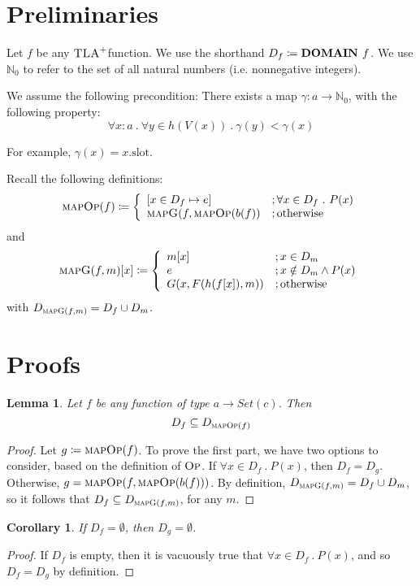 \documentclass{article}
\newtheorem{lemma}[theorem]{Lemma}
\newtheorem{corollary}[theorem]{Corollary}
\newcommand{\iteDef}[4]{
  #1 \coloneqq \left\{
\begin{array}{ll}
      #2 &; #3 \\
      #4 &; \text{otherwise}\\
\end{array} 
\right. 
}
\newcommand{\tlap}{$\textsc{TLA}^{+}$}
\newcommand{\nat}{\mathbb N_0}
\newcommand{\op}{\textsc{Op}}
\newcommand{\mop}{\textsc{mapOp}}
\newcommand{\mapg}{\textsc{mapG}}
\begin{document}
\section{Preliminaries}
Let $f$ be any \tlap function. We use the shorthand $D_f \coloneqq \text{\bf DOMAIN } f$.
We use $\nat$ to refer to the set of all natural numbers (i.e. nonnegative integers).

We assume the following precondition: There exists a map $\gamma: a \to \nat$, with the following property:
\[
\forall x\colon a \ .\ \forall y \in h(V(x)) \ .\ \gamma(y) < \gamma(x) 
\]

For example, $\gamma(x) = x.\text{slot}$.

Recall the following definitions:
\[
\iteDef{\mop(f)}{[ x \in D_f \mapsto e ]}{\forall x \in D_f \ .\ P(x)}{\mapg(f, \mop(b(f))}
\]
and
\[
\mapg(f, m)[x] \coloneqq \left\{
\begin{array}{ll}
      m[x] &; x \in D_m \\
      e &; x \notin D_m \land P(x) \\
      G(x, F(h(f[x]), m)) &; \text{otherwise}\\
\end{array} 
\right. 
\]
with $D_{\mapg(f,m)} = D_f \cup D_m$.

\section{Proofs}

\begin{lemma}\label{lemma1}
Let $f$ be any function of type $a \to Set(c)$. Then
\[
D_f \subseteq D_{\mop(f)}
\]
\end{lemma}
\begin{proof}
Let $g \coloneqq \mop(f)$. To prove the first part, we have two options to consider, based on the definition of $\op$. If $\forall x \in D_f \ .\ P(x)$, then $D_f = D_g$.
Otherwise, $g = \mop(f,\mop(b(f)))$. By definition, $D_{\mapg(f,m)} = D_f \cup D_m$, so it follows that $D_f \subseteq D_{\mapg(f,m)}$, for any $m$. 
\end{proof}
\begin{corollary}
If $D_f = \emptyset$, then $D_{g} = \emptyset$.
\end{corollary}
\begin{proof}
If $D_f$ is empty, then it is vacuously true that $\forall x \in D_f \ .\ P(x)$, and so $D_f = D_g$ by definition.
\end{proof}
\end{document}
